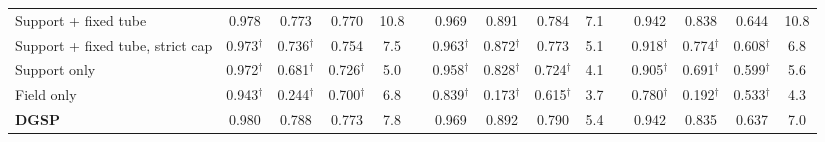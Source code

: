 \documentclass[10pt,letterpaper]{article}
\newcommand{\method}{DGSP\xspace}
\newcommand{\oursrow}{\rowcolor{oursbg}}
\theoremstyle{remark}
\theoremstyle{plain}
\theoremstyle{definition}
\begin{document}
\begin{table}[!htbp]
\begin{tabular}{@{}lcccccccccccccc@{}}
\midrule
Support + fixed tube & 0.978 & 0.773 & 0.770 & 10.8 &  & 0.969 & 0.891 & 0.784 & 7.1 &  & 0.942 & 0.838 & 0.644 & 10.8 \\
Support + fixed tube, strict cap & 0.973$^{\dagger}$ & 0.736$^{\dagger}$ & 0.754 & 7.5 &  & 0.963$^{\dagger}$ & 0.872$^{\dagger}$ & 0.773 & 5.1 &  & 0.918$^{\dagger}$ & 0.774$^{\dagger}$ & 0.608$^{\dagger}$ & 6.8 \\
Support only & 0.972$^{\dagger}$ & 0.681$^{\dagger}$ & 0.726$^{\dagger}$ & 5.0 &  & 0.958$^{\dagger}$ & 0.828$^{\dagger}$ & 0.724$^{\dagger}$ & 4.1 &  & 0.905$^{\dagger}$ & 0.691$^{\dagger}$ & 0.599$^{\dagger}$ & 5.6 \\
Field only & 0.943$^{\dagger}$ & 0.244$^{\dagger}$ & 0.700$^{\dagger}$ & 6.8 &  & 0.839$^{\dagger}$ & 0.173$^{\dagger}$ & 0.615$^{\dagger}$ & 3.7 &  & 0.780$^{\dagger}$ & 0.192$^{\dagger}$ & 0.533$^{\dagger}$ & 4.3 \\
\midrule
\oursrow \textbf{\method} & 0.980 & 0.788 & 0.773 & 7.8 &  & 0.969 & 0.892 & 0.790 & 5.4 &  & 0.942 & 0.835 & 0.637 & 7.0 \\
\bottomrule
\end{tabular}
\end{table}
\end{document}
